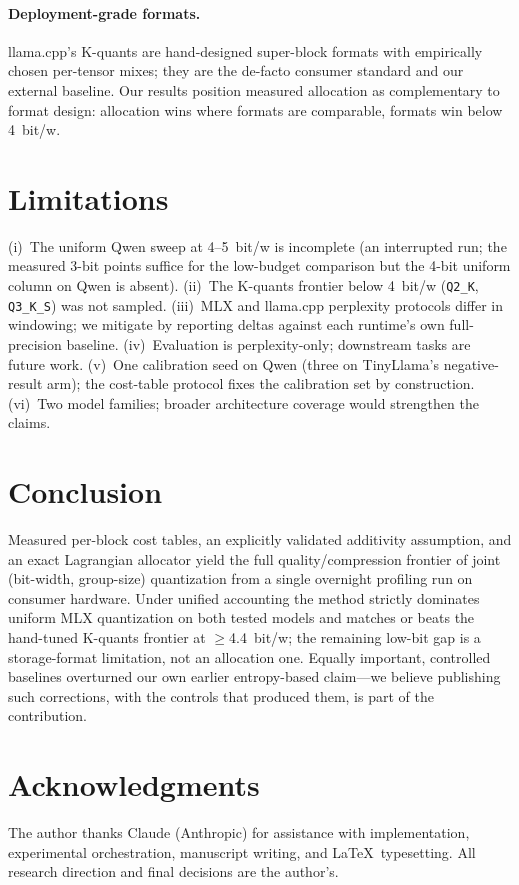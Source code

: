 \documentclass{article}
\begin{document}
\paragraph{Deployment-grade formats.}
llama.cpp's K-quants \citep{llamacpp} are hand-designed super-block
formats with empirically chosen per-tensor mixes; they are the de-facto
consumer standard and our external baseline. Our results position measured
allocation as complementary to format design: allocation wins where formats
are comparable, formats win below 4~bit/w.

\section{Limitations}
\label{sec:limits}

(i)~The uniform Qwen sweep at 4--5~bit/w is incomplete (an interrupted run;
the measured 3-bit points suffice for the low-budget comparison but the
4-bit uniform column on Qwen is absent). (ii)~The K-quants frontier below
4~bit/w (\texttt{Q2\_K}, \texttt{Q3\_K\_S}) was not sampled. (iii)~MLX and
llama.cpp perplexity protocols differ in windowing; we mitigate by
reporting deltas against each runtime's own full-precision baseline.
(iv)~Evaluation is perplexity-only; downstream tasks are future work.
(v)~One calibration seed on Qwen (three on TinyLlama's negative-result
arm); the cost-table protocol fixes the calibration set by construction.
(vi)~Two model families; broader architecture coverage would strengthen
the claims.

\section{Conclusion}

Measured per-block cost tables, an explicitly validated additivity
assumption, and an exact Lagrangian allocator yield the full
quality/compression frontier of joint (bit-width, group-size) quantization
from a single overnight profiling run on consumer hardware. Under unified
accounting the method strictly dominates uniform MLX quantization on both
tested models and matches or beats the hand-tuned K-quants frontier at
$\geq$4.4~bit/w; the remaining low-bit gap is a storage-format limitation,
not an allocation one. Equally important, controlled baselines overturned
our own earlier entropy-based claim---we believe publishing such
corrections, with the controls that produced them, is part of the
contribution.

\section*{Acknowledgments}
The author thanks Claude (Anthropic) for assistance with implementation,
experimental orchestration, manuscript writing, and \LaTeX\ typesetting.
All research direction and final decisions are the author's.



\end{document}
